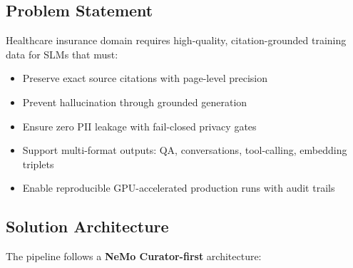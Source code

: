 \documentclass[11pt,a4paper]{article}
\begin{document}
\subsection{Problem Statement}
Healthcare insurance domain requires high-quality, citation-grounded training data for SLMs that must:
\begin{itemize}[label=\textcolor{nvidiaGreen}{$\triangleright$}, leftmargin=*]
    \item Preserve exact source citations with page-level precision
    \item Prevent hallucination through grounded generation
    \item Ensure zero PII leakage with fail-closed privacy gates
    \item Support multi-format outputs: QA, conversations, tool-calling, embedding triplets
    \item Enable reproducible GPU-accelerated production runs with audit trails
\end{itemize}

\subsection{Solution Architecture}
The pipeline follows a \textbf{NeMo Curator-first} architecture:
\end{document}
